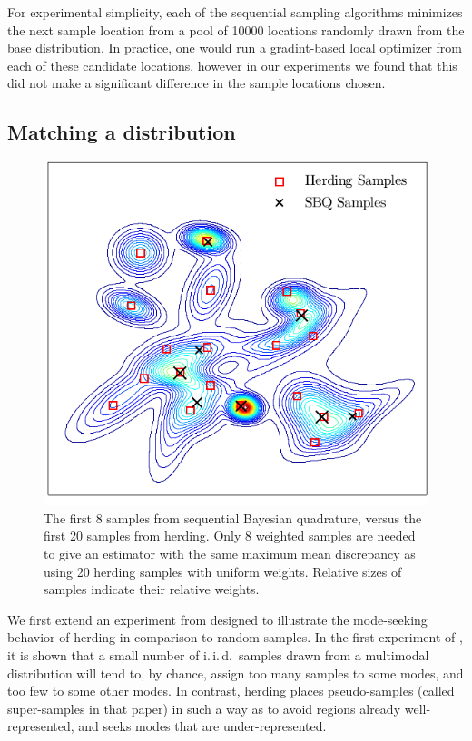 For experimental simplicity, each of the sequential sampling algorithms minimizes the next sample location from a pool of 10000 locations randomly drawn from the base distribution. In practice, one would run a gradint-based local optimizer from each of these candidate locations, however in our experiments we found that this did not make a significant difference in the sample locations chosen. 

\subsection{Matching a distribution}

\begin{figure}[h]
\centering
\includegraphics[width=.8\columnwidth]{figs/herding/fig1_v2}
\caption[Sequential Bayesian quadrature versus kernel herding]{The first 8 samples from sequential Bayesian quadrature, versus the first 20 samples from herding. Only 8 weighted \sbq{} samples are needed to give an estimator with the same maximum mean discrepancy as using 20 herding samples with uniform weights. Relative sizes of samples indicate their relative weights.\label{fig:fig1}}
\end{figure} 

We first extend an experiment from \citep{Chen2010} designed to illustrate the mode-seeking behavior of herding in comparison to random samples. In the first experiment of \citep{Chen2010}, it is shown that a small number of i.\,i.\,d.\ samples drawn from a multimodal distribution will tend to, by chance, assign too many samples to some modes, and too few to some other modes. In contrast, herding places pseudo-samples (called super-samples in that paper) in such a way as to avoid regions already well-represented, and seeks modes that are under-represented.

